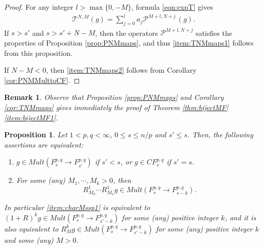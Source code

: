\documentclass[12pt,twoside,leqno,final]{amsart}
\theoremstyle{plain}
\newtheorem{prop}[thm]{Proposition}
\newtheorem{rem}[thm]{Remark}
\begin{document}
\begin{proof}
For any  integer $l>\max\{0,-M\}$, formula \eqref{eqn:expT} gives 
\begin{align*}
{{\mathcal T}}^{N,M}(g)=\sum_{j=0}^{l} a_j {{\mathcal P}}^{M+l,N+j}\,(g).
\end{align*}
If $s>s'$ and $s>s'+N-M$, then the operators ${{\mathcal P}}^{M+l,N+j}$ satisfies the 
properties of Proposition \ref{prop:PNMmaps}, and thus \eqref{item:TNMmaps1}  follows from this proposition.

If $N-M<0$, then \eqref{item:TNMmaps2} follows from Corollary \ref{cor:PNMMulttoCF}.
\end{proof}

\begin{rem}\label{rem:obsthm}
Observe that  Proposition \ref{prop:PNMmaps} and Corollary \ref{cor:TNMmaps}  
gives immediately the proof of Theorem \ref{thm:bijectMF}\eqref{item:bijectMF1}.
\end{rem}

\begin{prop}\label{prop:charMssp}
Let $1<p,q<\infty$,  $0\le s\le n/p$ and  $ s'\le s$. Then, the following assertions are equivalent:
\begin{enumerate}
	\item \label{item:charMssp1} $g\in Mult(F^{p,q}_s\to F^{p,q}_{s'})$ if $s'<s$, 
or $g\in CF^{p,q}_s$ if $s'=s$.
	\item \label{item:charMssp4} For some (any) $M_1,\cdots, M_k>0$, then 
	$$
	R^1_{M_k}\cdots R^1_{M_1}g\in  Mult(F^{p,q}_s\to F^{p,q}_{s-k}).
	$$
\end{enumerate} 

In particular \eqref{item:charMssp1} is equivalent to $(1+R)^kg\in Mult(F^{p,q}_s\to F^{p,q}_{s'-k})$ for some (any) positive integer $k$, and it is also equivalent to 
$R^k_M g\in Mult(F^{p,q}_s\to F^{p,q}_{s'-k})$ for some (any) positive integer $k$ 
and some (any) $M>0$.
\end{prop}
\end{document}
